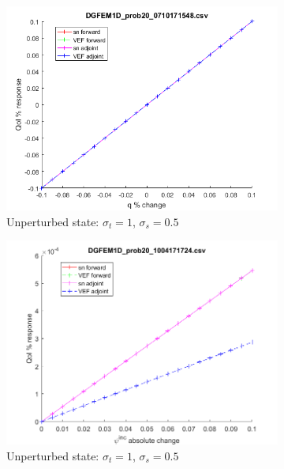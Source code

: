 \documentclass[12pt]{report}
\newcommand{\sigt}{\sigma_t}
\newcommand{\sigs}{\sigma_s}
\begin{document}
\begin{figure}[H]
\begin{subfigure}{.5\textwidth}
  \includegraphics[width=.98\linewidth]{figures/20qSens.png}
  \caption{Unperturbed state: $\sigt=1$, $\sigs=0.5$}
  \label{fig:sfig2}
\end{subfigure}%
\begin{subfigure}{.5\textwidth}
  \centering
  \includegraphics[width=.98\linewidth]{figures/20incSens.png}
  \caption{Unperturbed state: $\sigt=1$, $\sigs=0.5$}
  \label{fig:sfig5}
\end{subfigure}%
\\
\begin{subfigure}{.5\textwidth}
  \centering

\end{subfigure}
\end{figure}
\end{document}

